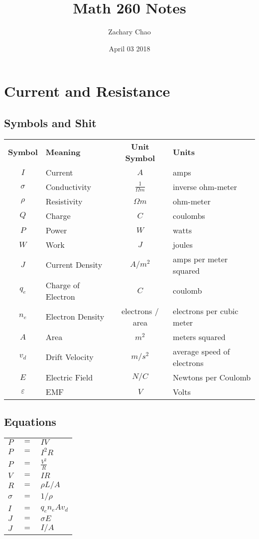 \documentclass[12pt, letterpaper, twoside]{article}
\title{Math 260 Notes}
\author{Zachary Chao}
\date{April 03 2018}
\begin{document}
\setcounter{section}{8}
\section{Current and Resistance}
  \subsection*{Symbols and Shit}
    \begin{tabular}{c l c l}
  	  \textbf{Symbol} & \textbf{Meaning} & \textbf{Unit Symbol} & \textbf{Units}\\
      $I$ & Current & $A$ & amps\\
      $\sigma$ & Conductivity & $\frac{1}{\Omega m}$ & inverse ohm-meter\\
      $\rho$ & Resistivity & $\Omega m$ & ohm-meter\\
      $Q$ & Charge & $C$ & coulombs\\
      $P$ & Power & $W$ & watts\\
      $W$ & Work & $J$ & joules\\
      $J$ & Current Density & $A/m^2$ & amps per meter squared\\
      $q_e$ & Charge of Electron & $C$ & coulomb\\
      $n_e$ & Electron Density & electrons / area & electrons per cubic meter\\
      $A$ & Area & $m^2$ & meters squared\\
      $v_d$ & Drift Velocity & $m/s^2$ & average speed of electrons\\
      $E$ & Electric Field & $N/C$ & Newtons per Coulomb\\
      $\varepsilon$ & EMF & $V$ & Volts\\
    \end{tabular}
  
  \subsection*{Equations}
    \begin{tabular}{l c l}
      $P$ & $=$ & $IV$\\
      $P$ & $=$ & $I^2R$\\
      $P$ & $=$ & $\frac{V^2}{R}$\\
      $V$ & $=$ & $IR$\\
      $R$ & $=$ & $\rho L / A$\\
      $\sigma$ & $=$ & $1/\rho$\\
      $I$ & $=$ & $q_en_eAv_d$\\
      $J$ & $=$ & $\sigma E$\\
      $J$ & $=$ & $I/A$\\
    \end{tabular}
    
\end{document}
